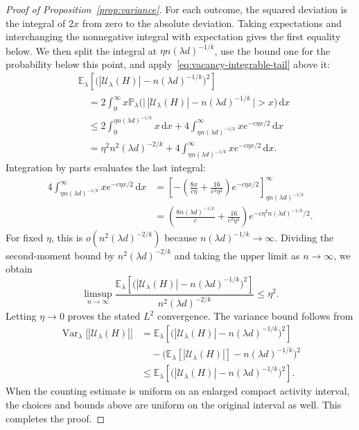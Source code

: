 \documentclass[11pt,reqno]{amsart}
\numberwithin{equation}{section}
\theoremstyle{plain}
\theoremstyle{definition}
\newcommand{\E}{\mathbb E}
\newcommand{\Prob}{\mathbb P}
\newcommand{\Var}{\operatorname{Var}}
\newcommand{\calU}{\mathcal U}
\newcommand{\dd}{\,\mathrm d}
\begin{document}
\begin{proof}[Proof of Proposition~\ref{prop:variance}]
    For each outcome, the squared deviation is the integral of $2x$ from zero to the absolute deviation.
    Taking expectations and interchanging the nonnegative integral with expectation gives the first equality below.
    We then split the integral at $\eta n(\lambda d)^{-1/k}$, use the bound one for the probability below this point, and apply~\eqref{eq:vacancy-integrable-tail} above it:
    \[
        \begin{aligned}
            &\E_\lambda\left[\bigl(|\calU_\lambda(H)|-n(\lambda d)^{-1/k}\bigr)^2\right]\\
            &\quad=2\int_0^\infty x\Prob_\lambda\bigl(\bigl\lvert\,|\calU_\lambda(H)|-n(\lambda d)^{-1/k}\,\bigr\rvert>x\bigr)\dd x\\
            &\quad\le2\int_0^{\eta n(\lambda d)^{-1/k}}x\dd x
            +4\int_{\eta n(\lambda d)^{-1/k}}^\infty xe^{-c\eta x/2}\dd x\\
            &\quad=\eta^2n^2(\lambda d)^{-2/k}
            +4\int_{\eta n(\lambda d)^{-1/k}}^\infty xe^{-c\eta x/2}\dd x.
        \end{aligned}
    \]
    Integration by parts evaluates the last integral:
    \[
        \begin{aligned}
            4\int_{\eta n(\lambda d)^{-1/k}}^\infty xe^{-c\eta x/2}\dd x
            &=\left[-\left(\frac{8x}{c\eta}+\frac{16}{c^2\eta^2}\right)e^{-c\eta x/2}\right]_{\eta n(\lambda d)^{-1/k}}^\infty\\
            &=\left(\frac{8n(\lambda d)^{-1/k}}c+\frac{16}{c^2\eta^2}\right)
            e^{-c\eta^2n(\lambda d)^{-1/k}/2}.
        \end{aligned}
    \]
    For fixed $\eta$, this is $o(n^2(\lambda d)^{-2/k})$ because $n(\lambda d)^{-1/k}\to\infty$.
    Dividing the second-moment bound by $n^2(\lambda d)^{-2/k}$ and taking the upper limit as $n\to\infty$, we obtain
    \[
        \limsup_{n\to\infty}
        \frac{\E_\lambda\left[\bigl(|\calU_\lambda(H)|-n(\lambda d)^{-1/k}\bigr)^2\right]}
        {n^2(\lambda d)^{-2/k}}\le\eta^2.
    \]
    Letting $\eta\to0$ proves the stated $L^2$ convergence.
    The variance bound follows from
    \[
        \begin{aligned}
            \Var_\lambda\bigl[|\calU_\lambda(H)|\bigr]
            &=\E_\lambda\left[\bigl(|\calU_\lambda(H)|-n(\lambda d)^{-1/k}\bigr)^2\right]\\
            &\quad-\bigl(\E_\lambda[|\calU_\lambda(H)|]-n(\lambda d)^{-1/k}\bigr)^2\\
            &\le\E_\lambda\left[\bigl(|\calU_\lambda(H)|-n(\lambda d)^{-1/k}\bigr)^2\right].
        \end{aligned}
    \]
    When the counting estimate is uniform on an enlarged compact activity interval, the choices and bounds above are uniform on the original interval as well.
    This completes the proof.
\end{proof}
\end{document}

